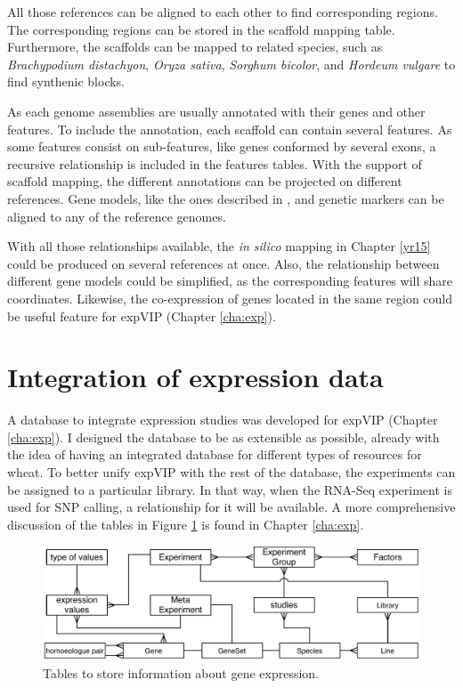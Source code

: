 All those references can be aligned to each other to find corresponding regions. 
The corresponding regions can be stored in the scaffold mapping table. 
Furthermore, the scaffolds can be mapped to related species, such as \textit{Brachypodium distachyon}, \textit{Oryza sativa}, \textit{Sorghum bicolor}, and \textit{Hordeum vulgare} to find synthenic blocks. 

As each genome assemblies are usually annotated with their genes and other features. 
To include the annotation, each scaffold can contain several features. 
As some features consist on sub-features, like genes conformed by several exons, a recursive relationship is included in the features tables. 
With the support of scaffold mapping, the different annotations can be projected on different references. 
Gene models, like the ones described in \citep{Krasileva2013}, and  genetic markers can be aligned to any of the reference genomes.

With all those relationships available, the \textit{in silico} mapping in Chapter \ref{yr15} could be produced on several references at once. 
Also, the relationship between different gene models could be simplified, as the corresponding features will share coordinates.
Likewise, the co-expression of genes located in the same region could be useful feature for expVIP (Chapter \ref{cha:exp}). 

\section{Integration of expression data}

A database to integrate expression studies was developed for expVIP (Chapter \ref{cha:exp}). 
I designed the database to be as extensible as possible, already with the idea of having an integrated database for different types of resources for wheat. 
To better unify expVIP with the rest of the database, the experiments can be assigned to a particular library. 
In that way, when the RNA-Seq experiment is used for SNP calling, a relationship for it will be available. 
A more comprehensive discussion of the tables in Figure \ref{fig:discussion:expressionTables} is found in Chapter \ref{cha:exp}. 

\begin{figure}[h]
\includegraphics[width=1\textwidth]{Conclusions/Figures/ExpressionTables.pdf}
\caption{Tables to store information about gene expression.}
\label{fig:discussion:expressionTables}
\end{figure}

